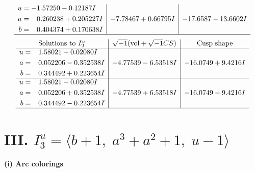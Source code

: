 \documentclass[1p]{elsarticle_modified}
\theoremstyle{definition}
\newcommand{\I}{\sqrt{-1}}
\begin{document}
$$\begin{array}{c|c|c}
\begin{aligned}
u &= -1.57250 - 0.12187 I \\
a &= \phantom{-}0.260238 + 0.205227 I \\
b &= \phantom{-}0.404374 + 0.170638 I\end{aligned}
 & -7.78467 + 0.66795 I & -17.6587 - 13.6602 I\\
 \hline 
 \end{array}$$\newpage$$\begin{array}{c|c|c}  
\text{Solutions to }I^u_{2}& \I (\text{vol} + \sqrt{-1}CS) & \text{Cusp shape}\\
 \hline 
\begin{aligned}
u &= \phantom{-}1.58021 + 0.02080 I \\
a &= \phantom{-}0.052206 - 0.352538 I \\
b &= \phantom{-}0.344492 + 0.223654 I\end{aligned}
 & -4.77539 - 6.53518 I & -16.0749 + 9.4216 I \\ \hline\begin{aligned}
u &= \phantom{-}1.58021 - 0.02080 I \\
a &= \phantom{-}0.052206 + 0.352538 I \\
b &= \phantom{-}0.344492 - 0.223654 I\end{aligned}
 & -4.77539 + 6.53518 I & -16.0749 - 9.4216 I\\
 \hline 
 \end{array}$$\newpage\newpage\renewcommand{\arraystretch}{1}
\centering \section*{III. $I^u_{3}= \langle b+1,\;a^3+a^2+1,\;u-1 \rangle$}
\flushleft \textbf{(i) Arc colorings}\\
\end{document}
